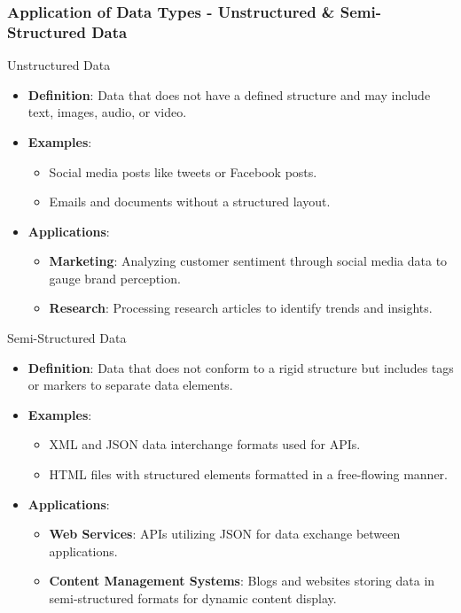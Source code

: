 \documentclass{beamer}
\begin{document}
\begin{frame}[fragile]
    \frametitle{Application of Data Types - Unstructured & Semi-Structured Data}
    \begin{block}{Unstructured Data}
        \begin{itemize}
            \item \textbf{Definition}: Data that does not have a defined structure and may include text, images, audio, or video.
            \item \textbf{Examples}:
                \begin{itemize}
                    \item Social media posts like tweets or Facebook posts.
                    \item Emails and documents without a structured layout.
                \end{itemize}
            \item \textbf{Applications}:
                \begin{itemize}
                    \item \textbf{Marketing}: Analyzing customer sentiment through social media data to gauge brand perception.
                    \item \textbf{Research}: Processing research articles to identify trends and insights.
                \end{itemize}
        \end{itemize}
    \end{block}
    
    \begin{block}{Semi-Structured Data}
        \begin{itemize}
            \item \textbf{Definition}: Data that does not conform to a rigid structure but includes tags or markers to separate data elements.
            \item \textbf{Examples}:
                \begin{itemize}
                    \item XML and JSON data interchange formats used for APIs.
                    \item HTML files with structured elements formatted in a free-flowing manner.
                \end{itemize}
            \item \textbf{Applications}:
                \begin{itemize}
                    \item \textbf{Web Services}: APIs utilizing JSON for data exchange between applications.
                    \item \textbf{Content Management Systems}: Blogs and websites storing data in semi-structured formats for dynamic content display.
                \end{itemize}
        \end{itemize}
    \end{block}
\end{frame}
\end{document}
